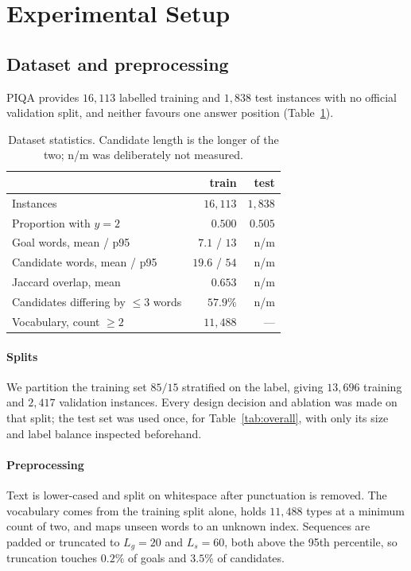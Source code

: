 \documentclass[11pt]{article}
\begin{document}
\section{Experimental Setup}

\subsection{Dataset and preprocessing}

PIQA provides $16{,}113$ labelled training and $1{,}838$ test instances with
no official validation split, and neither favours one answer position
(Table~\ref{tab:dataset}).

\begin{table}[t]
  \centering
  \footnotesize
  \begin{tabular}{@{}lrr@{}}
    \toprule
     & \textbf{train} & \textbf{test}\\
    \midrule
    Instances & $16{,}113$ & $1{,}838$\\
    Proportion with $y=2$ & $0.500$ & $0.505$\\
    Goal words, mean / p95 & $7.1$ / $13$ & n/m\\
    Candidate words, mean / p95 & $19.6$ / $54$ & n/m\\
    Jaccard overlap, mean & $0.653$ & n/m\\
    Candidates differing by $\leq3$ words & $57.9\%$ & n/m\\
    Vocabulary, count $\geq2$ & $11{,}488$ & ---\\
    \bottomrule
  \end{tabular}
  \caption{Dataset statistics. Candidate length is the longer of the two;
  n/m was deliberately not measured.}
  \label{tab:dataset}
\end{table}

\paragraph{Splits}
We partition the training set $85/15$ stratified on the label, giving
$13{,}696$ training and $2{,}417$ validation instances. Every design decision
and ablation was made on that split; the test set was used once, for
Table~\ref{tab:overall}, with only its size and label balance inspected
beforehand.

\paragraph{Preprocessing}
Text is lower-cased and split on whitespace after punctuation is removed. The
vocabulary comes from the training split alone, holds $11{,}488$ types at a
minimum count of two, and maps unseen words to an unknown index. Sequences are
padded or truncated to $L_g=20$ and $L_s=60$, both above the 95th percentile,
so truncation touches $0.2\%$ of goals and $3.5\%$ of candidates.
\end{document}
